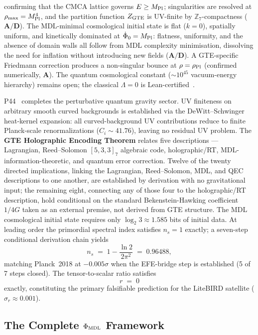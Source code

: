 confirming that the CMCA lattice governs $E \geq M_{\rm Pl}$; singularities are
resolved at $\rho_{\rm max} = M_{\rm Pl}^4$, and the partition function $Z_{\rm GTE}$
is UV-finite by $\mathbb{Z}_7$-compactness ($\mathbf{A/D}$).
The MDL-minimal cosmological initial state is flat ($k = 0$), spatially uniform, and
kinetically dominated at $\dot\Phi_0 = M_{\rm Pl}$: flatness, uniformity, and the
absence of domain walls all follow from MDL complexity minimisation, dissolving the
need for inflation without introducing new fields ($\mathbf{A/D}$).  A GTE-specific
Friedmann correction produces a non-singular bounce at $\rho = \rho_{\rm Pl}$
(confirmed numerically, $\mathbf{A}$).  The quantum cosmological constant
($\sim 10^{45}$ vacuum-energy hierarchy) remains open; the classical $\Lambda = 0$ is
Lean-certified~\cite{SpivackCompleteness}.

P44~\cite{SpivackQGR} completes the perturbative quantum gravity sector.
UV finiteness on arbitrary smooth curved backgrounds is established via the
DeWitt--Schwinger heat-kernel expansion: all curved-background UV contributions reduce
to finite Planck-scale renormalizations ($C_i \sim 41.76$), leaving no residual UV
problem.  The \textbf{GTE Holographic Encoding Theorem} relates five descriptions
--- Lagrangian, Reed--Solomon $[5,3,3]_7$ algebraic code, holographic/RT, MDL-information-theoretic,
and quantum error correction.  Twelve of the twenty directed implications, linking
the Lagrangian, Reed--Solomon, MDL, and QEC descriptions to one another, are
established by derivation with no gravitational input; the remaining eight, connecting
any of those four to the holographic/RT description, hold conditional on the standard
Bekenstein-Hawking coefficient $1/4G$ taken as an external premise, not derived from
GTE structure.  The MDL cosmological initial state requires only $\log_2 3
\approx 1.585$ bits of initial data.  At leading order the primordial spectral index
satisfies $n_s = 1$ exactly; a seven-step conditional derivation chain yields
\[
  n_s \;=\; 1 - \frac{\ln 2}{2\pi^2} \;=\; 0.96488,
\]
matching Planck~2018 at $-0.005\sigma$ when the EFE-bridge step is established
(5 of 7 steps closed).  The tensor-to-scalar ratio satisfies
\[
  r \;=\; 0
\]
exactly, constituting the primary falsifiable prediction for the LiteBIRD satellite
($\sigma_r \approx 0.001$).

\subsection{The Complete \texorpdfstring{$\Phi_{\rm MDL}$}{Phi\_MDL} Framework}
\label{subsec:overview-complete}

